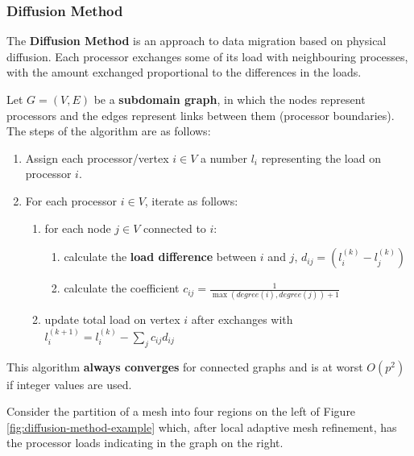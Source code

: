 \documentclass{article}
\begin{document}
\subsubsection{Diffusion Method}

The \textbf{Diffusion Method} is an approach to data migration based on physical diffusion. Each processor exchanges some of its load with neighbouring processes, with the amount exchanged proportional to the differences in the loads.

Let $G = (V, E)$ be a \textbf{subdomain graph}, in which the nodes represent processors and the edges represent links between them (processor boundaries). The steps of the algorithm are as follows:
\begin{enumerate}
	\item Assign each processor/vertex $i \in V$ a number $l_i$ representing the load on processor $i$.
	 \item For each processor $i \in V$, iterate as follows:
	 \begin{enumerate}
	 	\item for each node $j \in V$ connected to $i$:
	 		\begin{enumerate}
	 			\item calculate the \textbf{load difference} between $i$ and $j$, $d_{ij} = (l_i^{(k)} - l_j^{(k)})$
	 			\item calculate the coefficient $c_{ij} = \frac{1}{\max (degree(i), degree(j)) + 1}$
	 		\end{enumerate}	 		
	 	\item update total load on vertex $i$ after exchanges with $l_i^{(k+1)} = l_i^{(k)} - \sum_j {c_{ij}d_{ij}}$
	 \end{enumerate}
\end{enumerate}
This algorithm \textbf{always converges} for connected graphs and is at worst $O(p^2)$ if integer values are used.

Consider the partition of a mesh into four regions on the left of Figure \ref{fig:diffusion-method-example} which, after local adaptive mesh refinement, has the processor loads indicating in the graph on the right.
\end{document}
